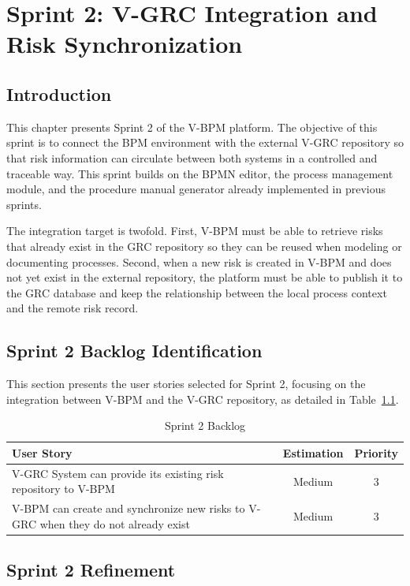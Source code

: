 \chapter{Sprint 2: V-GRC Integration and Risk Synchronization}

\section{Introduction}

This chapter presents Sprint 2 of the V-BPM platform. The objective of this sprint is to connect the BPM environment with the external V-GRC repository so that risk information can circulate between both systems in a controlled and traceable way. This sprint builds on the BPMN editor, the process management module, and the procedure manual generator already implemented in previous sprints.

The integration target is twofold. First, V-BPM must be able to retrieve risks that already exist in the GRC repository so they can be reused when modeling or documenting processes. Second, when a new risk is created in V-BPM and does not yet exist in the external repository, the platform must be able to publish it to the GRC database and keep the relationship between the local process context and the remote risk record.

\section{Sprint 2 Backlog Identification}

This section presents the user stories selected for Sprint 2, focusing on the integration between V-BPM and the V-GRC repository, as detailed in Table~\ref{tab:backlog-sprint2}.

\begin{table}[H]
\centering
\caption{Sprint 2 Backlog}
\label{tab:backlog-sprint2}
\begin{tabular}{|p{9cm}|c|c|}
\hline
\textbf{User Story} & \textbf{Estimation} & \textbf{Priority} \\
\hline
V-GRC System can provide its existing risk repository to V-BPM & Medium & 3 \\
\hline
V-BPM can create and synchronize new risks to V-GRC when they do not already exist & Medium & 3 \\
\hline
\end{tabular}
\end{table}

\section{Sprint 2 Refinement}

